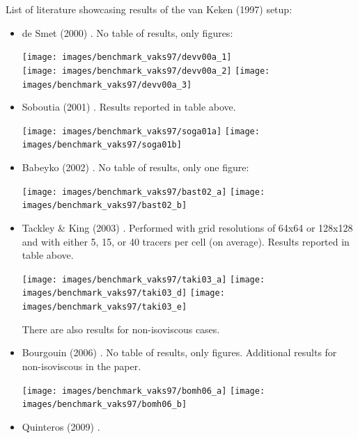 List of literature showcasing results of the van Keken \etal (1997) \cite{vaks97} setup:
\begin{itemize}
\item de Smet \etal (2000) \cite{devv00a}. No table of results, only figures:
\begin{center}
\texttt{[image: images/benchmark\_vaks97/devv00a\_1]}\\
\texttt{[image: images/benchmark\_vaks97/devv00a\_2]}
\texttt{[image: images/benchmark\_vaks97/devv00a\_3]}
\end{center}

\item Soboutia \etal (2001) \cite{soga01}. Results reported in table above.
\begin{center}
\texttt{[image: images/benchmark\_vaks97/soga01a]}
\texttt{[image: images/benchmark\_vaks97/soga01b]}
\end{center}

\item Babeyko \etal (2002) \cite{bast02}. No table of results, only one figure:
\begin{center}
\texttt{[image: images/benchmark\_vaks97/bast02\_a]}
\texttt{[image: images/benchmark\_vaks97/bast02\_b]}
\end{center}

\item Tackley \& King (2003) \cite{taki03}. Performed with grid resolutions of 
64x64 or 128x128 and with either 5, 15, or 40 tracers per cell (on average). 
Results reported in table above. 

\begin{center}
\texttt{[image: images/benchmark\_vaks97/taki03\_a]}
\texttt{[image: images/benchmark\_vaks97/taki03\_d]}
\texttt{[image: images/benchmark\_vaks97/taki03\_e]}
\end{center}

There are also results for non-isoviscous cases.

\item Bourgouin \etal (2006) \cite{bomh06}. No table of results, only figures.
Additional results for non-isoviscous in the paper.

\begin{center}
\texttt{[image: images/benchmark\_vaks97/bomh06\_a]}
\texttt{[image: images/benchmark\_vaks97/bomh06\_b]}
\end{center}

\item Quinteros \etal (2009) \cite{qurj09}.


\end{itemize}
